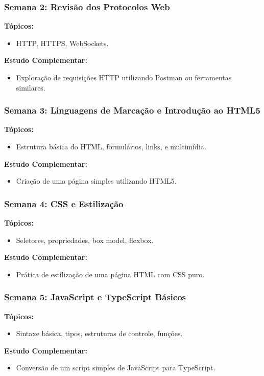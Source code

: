 \begin{frame}[fragile]
  \frametitle{Semana 2: Revisão dos Protocolos Web}
  \textbf{Tópicos:}
  \begin{itemize}
    \item HTTP, HTTPS, WebSockets.
  \end{itemize}
  \textbf{Estudo Complementar:}
  \begin{itemize}
    \item Exploração de requisições HTTP utilizando Postman ou ferramentas similares.
  \end{itemize}
\end{frame}

\begin{frame}[fragile]
  \frametitle{Semana 3: Linguagens de Marcação e Introdução ao HTML5}
  \textbf{Tópicos:}
  \begin{itemize}
    \item Estrutura básica do HTML, formulários, links, e multimídia.
  \end{itemize}
  \textbf{Estudo Complementar:}
  \begin{itemize}
    \item Criação de uma página simples utilizando HTML5.
  \end{itemize}
\end{frame}

\begin{frame}[fragile]
  \frametitle{Semana 4: CSS e Estilização}
  \textbf{Tópicos:}
  \begin{itemize}
    \item Seletores, propriedades, box model, flexbox.
  \end{itemize}
  \textbf{Estudo Complementar:}
  \begin{itemize}
    \item Prática de estilização de uma página HTML com CSS puro.
  \end{itemize}
\end{frame}

\begin{frame}[fragile]
  \frametitle{Semana 5: JavaScript e TypeScript Básicos}
  \textbf{Tópicos:}
  \begin{itemize}
    \item Sintaxe básica, tipos, estruturas de controle, funções.
  \end{itemize}
  \textbf{Estudo Complementar:}
  \begin{itemize}
    \item Conversão de um script simples de JavaScript para TypeScript.
  \end{itemize}
\end{frame}

